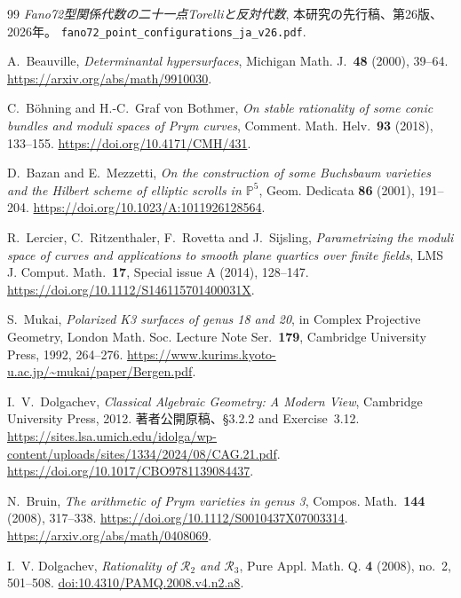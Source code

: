 \clearpage
\begingroup\small
\begin{thebibliography}{99}
\setlength{\itemsep}{2pt}
\setlength{\parskip}{0pt}
\emph{Fano72型関係代数の二十一点Torelliと反対代数}, 本研究の先行稿、第26版、2026年。
\nolinkurl{fano72_point_configurations_ja_v26.pdf}.

A.~Beauville, \emph{Determinantal hypersurfaces}, Michigan Math. J.\ \textbf{48} (2000), 39--64.
\url{https://arxiv.org/abs/math/9910030}.

C.~B\"ohning and H.-C.~Graf von Bothmer,
\emph{On stable rationality of some conic bundles and moduli spaces of Prym curves},
Comment. Math. Helv.\ \textbf{93} (2018), 133--155.
\url{https://doi.org/10.4171/CMH/431}.

D.~Bazan and E.~Mezzetti, \emph{On the construction of some Buchsbaum varieties and the Hilbert scheme of elliptic scrolls in $\mathbb P^5$},
Geom. Dedicata \textbf{86} (2001), 191--204.
\url{https://doi.org/10.1023/A:1011926128564}.

R.~Lercier, C.~Ritzenthaler, F.~Rovetta and J.~Sijsling,
\emph{Parametrizing the moduli space of curves and applications to smooth plane quartics over finite fields},
LMS J. Comput. Math.\ \textbf{17}, Special issue A (2014), 128--147.
\url{https://doi.org/10.1112/S146115701400031X}.

S.~Mukai, \emph{Polarized K3 surfaces of genus 18 and 20},
in Complex Projective Geometry, London Math. Soc. Lecture Note Ser.\ \textbf{179},
Cambridge University Press, 1992, 264--276.
\url{https://www.kurims.kyoto-u.ac.jp/~mukai/paper/Bergen.pdf}.

I.~V.~Dolgachev, \emph{Classical Algebraic Geometry: A Modern View},
Cambridge University Press, 2012.
著者公開原稿、\S3.2.2 and Exercise~3.12.
\url{https://sites.lsa.umich.edu/idolga/wp-content/uploads/sites/1334/2024/08/CAG.21.pdf}.
\url{https://doi.org/10.1017/CBO9781139084437}.

N.~Bruin, \emph{The arithmetic of Prym varieties in genus 3},
Compos. Math.\ \textbf{144} (2008), 317--338.
\url{https://doi.org/10.1112/S0010437X07003314}.
\url{https://arxiv.org/abs/math/0408069}.

I.~V. Dolgachev,
\emph{Rationality of $\mathcal R_2$ and $\mathcal R_3$},
Pure Appl. Math. Q. \textbf{4} (2008), no.~2, 501--508.
\href{https://doi.org/10.4310/PAMQ.2008.v4.n2.a8}{doi:10.4310/PAMQ.2008.v4.n2.a8}.


\end{thebibliography}
